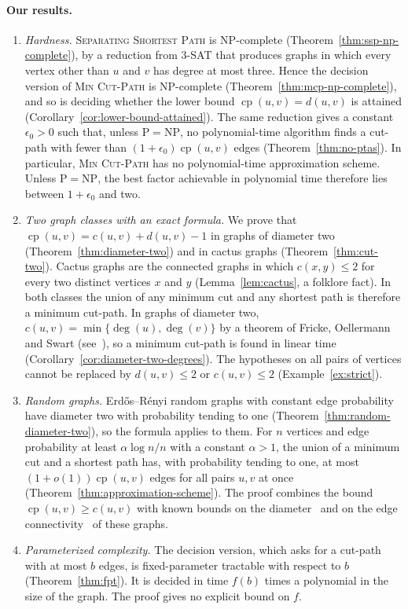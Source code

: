 \documentclass[a4paper,fleqn]{cas-sc}
\numberwithin{equation}{section}
\theoremstyle{definition}
\theoremstyle{plain}
\theoremstyle{remark}
\newcommand{\cp}{\operatorname{cp}}                  %
\newcommand{\MinCutPath}{\textsc{Min Cut-Path}}
\newcommand{\SSP}{\textsc{Separating Shortest Path}}
\newcommand{\ThreeSAT}{\textsc{3-SAT}}
\begin{document}
\paragraph{Our results.}
\begin{enumerate}
    \item \emph{Hardness.}
    \SSP{} is NP-complete (Theorem~\ref{thm:ssp-np-complete}), by a reduction from \ThreeSAT{} that produces graphs in which every vertex other than $u$ and $v$ has degree at most three.
    Hence the decision version of \MinCutPath{} is NP-complete (Theorem~\ref{thm:mcp-np-complete}), and so is deciding whether the lower bound $\cp(u,v) = d(u,v)$ is attained (Corollary~\ref{cor:lower-bound-attained}).
    The same reduction gives a constant $\epsilon_0 > 0$ such that, unless $\mathrm{P} = \mathrm{NP}$, no polynomial-time algorithm finds a cut-path with fewer than $(1+\epsilon_0)\cp(u,v)$ edges (Theorem~\ref{thm:no-ptas}).
    In particular, \MinCutPath{} has no polynomial-time approximation scheme.
    Unless $\mathrm{P} = \mathrm{NP}$, the best factor achievable in polynomial time therefore lies between $1+\epsilon_0$ and two.

    \item \emph{Two graph classes with an exact formula.}
    We prove that $\cp(u,v) = c(u,v) + d(u,v) - 1$ in graphs of diameter two (Theorem~\ref{thm:diameter-two}) and in cactus graphs (Theorem~\ref{thm:cut-two}).
    Cactus graphs are the connected graphs in which $c(x,y) \leq 2$ for every two distinct vertices $x$ and $y$ (Lemma~\ref{lem:cactus}, a folklore fact).
    In both classes the union of any minimum cut and any shortest path is therefore a minimum cut-path.
    In graphs of diameter two, $c(u,v) = \min\{\deg(u), \deg(v)\}$ by a theorem of Fricke, Oellermann and Swart (see~\cite[Theorem~11]{Stuart2009Eavesdropping}), so a minimum cut-path is found in linear time (Corollary~\ref{cor:diameter-two-degrees}).
    The hypotheses on all pairs of vertices cannot be replaced by $d(u,v) \leq 2$ or $c(u,v) \leq 2$ (Example~\ref{ex:strict}).

    \item \emph{Random graphs.}
    Erdős–Rényi random graphs with constant edge probability have diameter two with probability tending to one (Theorem~\ref{thm:random-diameter-two}), so the formula applies to them.
    For $n$ vertices and edge probability at least $\alpha \log n / n$ with a constant $\alpha > 1$, the union of a minimum cut and a shortest path has, with probability tending to one, at most $(1 + o(1))\cp(u,v)$ edges for all pairs $u, v$ at once (Theorem~\ref{thm:approximation-scheme}).
    The proof combines the bound $\cp(u,v) \geq c(u,v)$ with known bounds on the diameter~\cite{ChungLu2001} and on the edge connectivity~\cite{Bollobas2001} of these graphs.

    \item \emph{Parameterized complexity.}
    The decision version, which asks for a cut-path with at most $b$ edges, is fixed-parameter tractable with respect to $b$ (Theorem~\ref{thm:fpt}).
    It is decided in time $f(b)$ times a polynomial in the size of the graph.
    The proof gives no explicit bound on $f$.
\end{enumerate}
\end{document}
